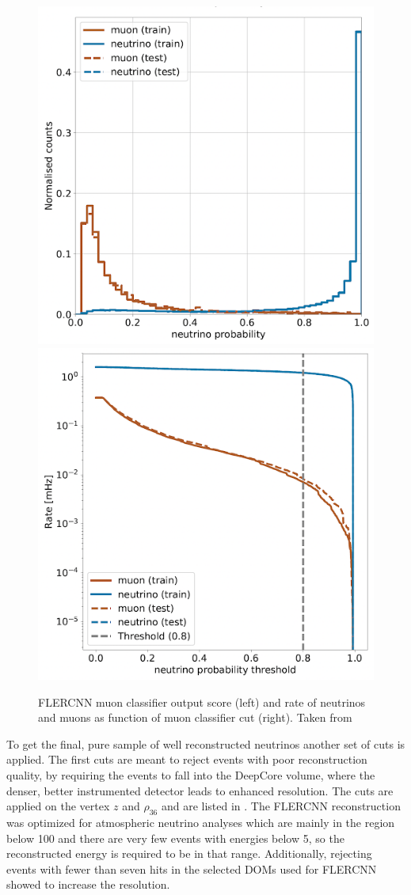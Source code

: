 \begin{figure}
\includegraphics[width=0.49\linewidth]{figures/simulation_and_processing/flercnn/flercnn_muon_classifier.png}
\includegraphics[width=0.49\linewidth]{figures/simulation_and_processing/flercnn/flercnn_muon_classifier_rate_vs_threshold.png}
\caption[FLERCNN muon classifier probability distributions]{FLERCNN muon classifier output score (left) and rate of neutrinos and muons as function of muon classifier cut (right). Taken from \cite{flercnn_analysis_internal_note}}
\end{figure}


To get the final, pure sample of well reconstructed neutrinos another set of cuts is applied. The first cuts are meant to reject events with poor reconstruction quality, by requiring the events to fall into the DeepCore volume, where the denser, better instrumented detector leads to enhanced resolution. The cuts are applied on the vertex $z$ and $\rho_{36}$ and are listed in . The FLERCNN reconstruction was optimized for atmospheric neutrino analyses which are mainly in the region below \SI{100}{\gev} and there are very few events with energies below \SI{5}{\gev}, so the reconstructed energy is required to be in that range. Additionally, rejecting events with fewer than seven hits in the selected DOMs used for FLERCNN showed to increase the resolution.

